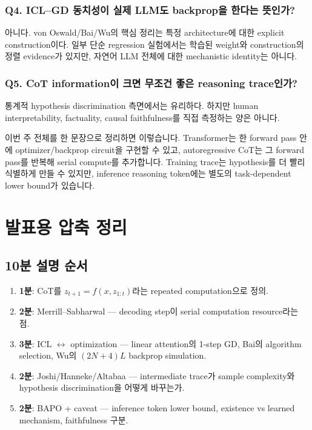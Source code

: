 \documentclass[11pt,a4paper,oneside,openany]{memoir}
\theoremstyle{definition}
\begin{document}
\subsection*{Q4. ICL--GD 동치성이 실제 LLM도 backprop을 한다는 뜻인가?}
아니다. von Oswald/Bai/Wu의 핵심 정리는 특정 architecture에 대한 explicit construction이다. 일부 단순 regression 실험에서는 학습된 weight와 construction의 정렬 evidence가 있지만, 자연어 LLM 전체에 대한 mechanistic identity는 아니다.

\subsection*{Q5. CoT information이 크면 무조건 좋은 reasoning trace인가?}
통계적 hypothesis discrimination 측면에서는 유리하다.
하지만 human interpretability, factuality, causal faithfulness를 직접 측정하는 양은 아니다.

\begin{presentbox}
이번 주 전체를 한 문장으로 정리하면 이렇습니다. Transformer는 한 forward pass 안에 optimizer/backprop circuit을 구현할 수 있고, autoregressive CoT는 그 forward pass를 반복해 serial compute를 추가합니다. Training trace는 hypothesis를 더 빨리 식별하게 만들 수 있지만, inference reasoning token에는 별도의 task-dependent lower bound가 있습니다.
\end{presentbox}

\chapter{발표용 압축 정리}

\section{10분 설명 순서}

\begin{enumerate}
\item \textbf{1분}: CoT를 $z_{t+1}=f(x,z_{1:t})$라는 repeated computation으로 정의.
\item \textbf{2분}: Merrill--Sabharwal --- decoding step이 serial computation resource라는 점.
\item \textbf{3분}: ICL $\leftrightarrow$ optimization --- linear attention의 1-step GD, Bai의 algorithm selection, Wu의 $(2N+4)L$ backprop simulation.
\item \textbf{2분}: Joshi/Hanneke/Altabaa --- intermediate trace가 sample complexity와 hypothesis discrimination을 어떻게 바꾸는가.
\item \textbf{2분}: BAPO + caveat --- inference token lower bound, existence vs learned mechanism, faithfulness 구분.
\end{enumerate}
\end{document}

